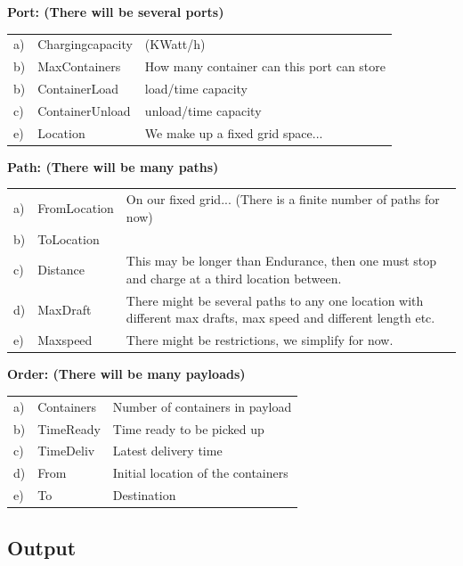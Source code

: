 \documentclass{article}
\begin{document}
\noindent
\textbf{Port: (There will be several ports)}    

\begin{tabular}{lll}
 a) & Chargingcapacity& (KWatt/h)\\
 b) & MaxContainers& How many container can this port can store\\
 b) & ContainerLoad& load/time capacity\\
 c) & ContainerUnload& unload/time capacity\\
 e) & Location& We make up a fixed grid space...\\
\end{tabular}
\vspace{1em}

\noindent
\textbf{Path: (There will be many paths)}    

\begin{tabularx}{0.95\textwidth}{llX}
 a) & FromLocation& On our fixed grid... (There is a finite number of paths for now)\\
 b) & ToLocation&\\
 c) & Distance& This may be longer than Endurance, then one must stop and charge at a third location between. \\
 d) & MaxDraft& There might be several paths to any one location with different max drafts, max speed and different length etc. \\
 e) & Maxspeed& There might be restrictions, we simplify for now.\\
\end{tabularx}
\vspace{1em}
        
\noindent
\textbf{Order: (There will be many payloads)}    

\begin{tabularx}{0.95\textwidth}{lll}
 a) & Containers& Number of containers in payload\\
 b) & TimeReady& Time ready to be picked up\\
 c) & TimeDeliv& Latest delivery time\\
 d) & From & Initial location of the containers \\
 e) & To & Destination \\
\end{tabularx}

\subsection{Output}
\end{document}
